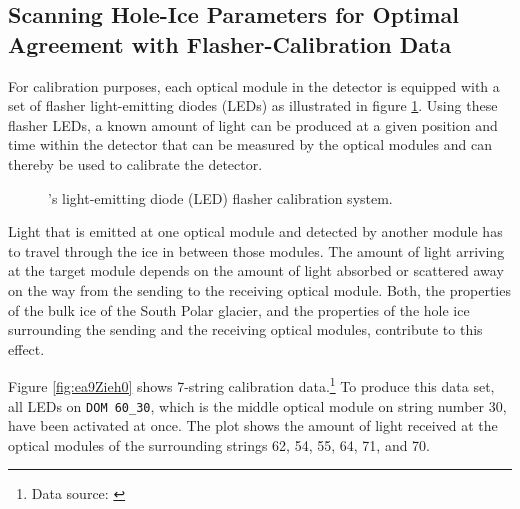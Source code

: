 \subsection{Scanning Hole-Ice Parameters for Optimal Agreement with Flasher-Calibration Data}
\label{sec:flasher}

For calibration purposes, each optical module in the \icecube detector
is equipped with a set of flasher light-emitting diodes (LEDs) as
illustrated in figure \ref{fig:Quee3yui}. Using these flasher LEDs, a
known amount of light can be produced at a given position and time
within the detector that can be measured by the optical modules and can
thereby be used to calibrate the detector. \cite{icepaper}

\begin{figure}[htbp]
  \hfill
  \caption{\icecube's light-emitting diode (LED) flasher calibration system.}
  \label{fig:Quee3yui}
\end{figure}

Light that is emitted at one optical module and detected by another
module has to travel through the ice in between those modules. The
amount of light arriving at the target module depends on the amount of
light absorbed or scattered away on the way from the sending to the
receiving optical module. Both, the properties of the bulk ice of the
South Polar glacier, and the properties of the hole ice surrounding the
sending and the receiving optical modules, contribute to this effect.

Figure \ref{fig:ea9Zieh0} shows 7-string calibration
data.\footnote{Data source: \cite{flasherdata}} To produce this data
set, all LEDs on \texttt{DOM 60\_30}, which is the middle optical module
on string number 30, have been activated at once. The plot shows the
amount of light received at the optical modules of the surrounding
strings 62, 54, 55, 64, 71, and 70.

